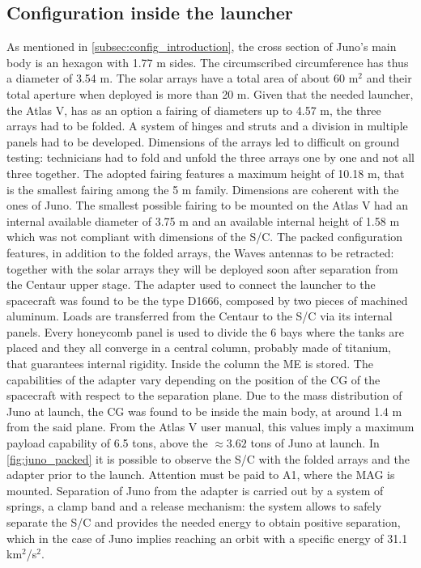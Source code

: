 \subsection{Configuration inside the launcher}
\label{subsec:config_launcher}

As mentioned in \autoref{subsec:config_introduction}, the cross section of Juno's main body is an hexagon with 1.77 m sides. The circumscribed circumference has thus a diameter of 3.54 m. The solar arrays have a total area of about 60 m$^2$ and their total aperture when deployed is more than 20 m.\cite{masses_ref} Given that the needed launcher, the Atlas V, has as an option a fairing of diameters up to 4.57 m, the three arrays had to be folded. A system of hinges and struts and a division in multiple panels had to be developed.\cite{solar_panels_coef} Dimensions of the arrays led to difficult on ground testing: technicians had to fold and unfold the three arrays one by one and not all three together.\cite{solar_panels_testing} The adopted fairing features a maximum height of 10.18 m, that is the smallest fairing among the 5 m family.\cite{atlas_manual} Dimensions are coherent with the ones of Juno. The smallest possible fairing to be mounted on the Atlas V had an internal available diameter of 3.75 m 
and an available internal height of 1.58 m which was not compliant with dimensions of the S/C. 
The packed configuration features, in addition to the folded arrays, the Waves antennas to be retracted: together with the solar arrays they will be deployed soon after separation from the Centaur upper stage. The adapter used to connect the launcher to the spacecraft was found to be the type D1666, composed by two pieces of machined aluminum. Loads are transferred from the Centaur to the S/C via its internal panels. Every honeycomb panel is used to divide the 6 bays where the tanks are placed and they all converge in a central column, probably made of titanium, that guarantees internal rigidity. Inside the column the ME is stored. The capabilities of the adapter vary depending on the position of the CG of the spacecraft with respect to the separation plane. Due to the mass distribution of Juno at launch, the CG was found to be inside the main body, at around 1.4 m from the said plane. From the Atlas V user manual\cite{atlas_manual}, this values imply a maximum payload capability of 6.5 tons, above the $\approx 3.62$ tons of Juno at launch.\cite{masses_ref}
In \autoref{fig:juno_packed}\cite{foto_fairing} it is possible to observe the S/C with the folded arrays and the adapter prior to the launch. Attention must be paid to A1, where the MAG is mounted. 
Separation of Juno from the adapter is carried out by a system of springs, a clamp band and a release mechanism: the system allows to safely separate the S/C and provides the needed energy to obtain positive separation, which in the case of Juno implies reaching an orbit with a specific energy of 31.1 km$^2$/s$^2$. 

